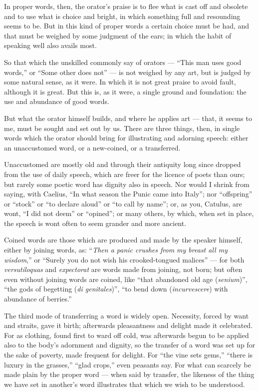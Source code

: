  In proper words, then, the orator's praise is to flee what is cast off and obsolete and to use what is choice and bright, in which something full and resounding seems to be. But in this kind of proper words a certain choice must be had, and that must be weighed by some judgment of the ears; in which the habit of speaking well also avails most.

 So that which the unskilled commonly say of orators — ``This man uses good words,'' or ``Some other does not'' — is not weighed by any art, but is judged by some natural sense, as it were. In which it is not great praise to avoid fault, although it is great. But this is, as it were, a single ground and foundation: the use and abundance of good words.

 But what the orator himself builds, and where he applies art — that, it seems to me, must be sought and set out by us. There are three things, then, in single words which the orator should bring for illustrating and adorning speech: either an unaccustomed word, or a new-coined, or a transferred.

 Unaccustomed are mostly old and through their antiquity long since dropped from the use of daily speech, which are freer for the licence of poets than ours; but rarely some poetic word has dignity also in speech. Nor would I shrink from saying, with Caelius, ``In what season the Punic came into Italy''; nor ``offspring'' or ``stock'' or ``to declare aloud'' or ``to call by name''; or, as you, Catulus, are wont, ``I did not deem'' or ``opined''; or many others, by which, when set in place, the speech is wont often to seem grander and more ancient.

 Coined words are those which are produced and made by the speaker himself, either by joining words, as: ``\textit{Then a panic crushes from my breast all my wisdom},'' or ``Surely you do not wish his crooked-tongued malices'' — for both \textit{versutiloquas} and \textit{expectorat} are words made from joining, not born; but often even without joining words are coined, like ``that abandoned old age (\textit{senium})'', ``the gods of begetting (\textit{di genitales})'', ``to bend down (\textit{incurvescere}) with abundance of berries.''

 The third mode of transferring a word is widely open. Necessity, forced by want and straits, gave it birth; afterwards pleasantness and delight made it celebrated. For as clothing, found first to ward off cold, was afterwards begun to be applied also to the body's adornment and dignity, so the transfer of a word was set up for the sake of poverty, made frequent for delight. For ``the vine sets gems,'' ``there is luxury in the grasses,'' ``glad crops,'' even peasants say. For what can scarcely be made plain by the proper word — when said by transfer, the likeness of the thing we have set in another's word illustrates that which we wish to be understood.

